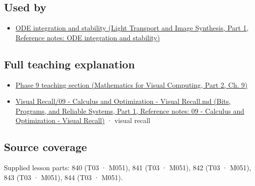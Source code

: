 \subsection{Used by}\label{appendix-8f96f9c4d5bc-used-by}

\hypertarget{appendix-8f96f9c4d5bc-used-by}{}

\begin{itemize}
\tightlist
\item
  \href{../04-Light-Transport-and-Image-Synthesis-P01/main.pdf\#nameddest=appendix-18eacf61a04b}{ODE integration and stability (Light Transport and Image Synthesis, Part 1, Reference notes: ODE integration and stability)}
\end{itemize}

\subsection{Full teaching explanation}\label{appendix-8f96f9c4d5bc-full-teaching-explanation}

\hypertarget{appendix-8f96f9c4d5bc-full-teaching-explanation}{}

\begin{itemize}
\tightlist
\item
  \href{../02-Mathematics-for-Visual-Computing-P02/main.pdf\#nameddest=02-foundations-ii-ch025-odes-and-numerical-simulation}{Phase 9 teaching section (Mathematics for Visual Computing, Part 2, Ch. 9)}
\item
  \href{../01-Bits-Programs-and-Reliable-Systems-P01/main.pdf\#nameddest=appendix-adf48f5dc5c1}{Visual Recall/09 - Calculus and Optimization - Visual Recall.md (Bits, Programs, and Reliable Systems, Part 1, Reference notes: 09 - Calculus and Optimization - Visual Recall)} · visual recall
\end{itemize}

\subsection{Source coverage}\label{appendix-8f96f9c4d5bc-source-coverage}

\hypertarget{appendix-8f96f9c4d5bc-source-coverage}{}

Supplied lesson parts: 840 (T03 · M051), 841 (T03 · M051), 842 (T03 · M051), 843 (T03 · M051), 844 (T03 · M051).
